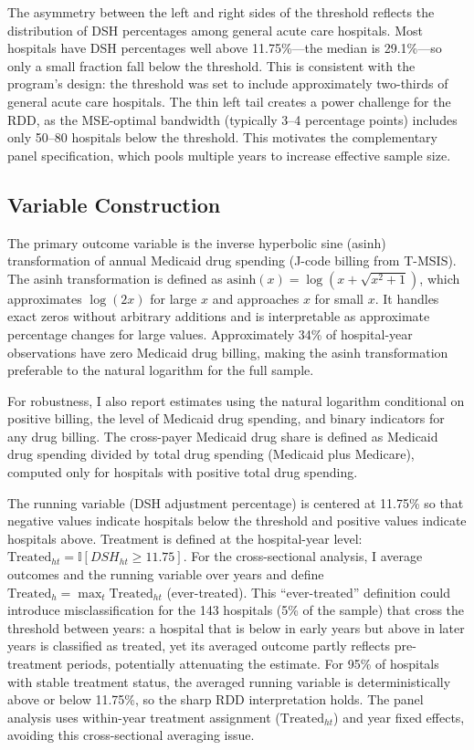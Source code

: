 \documentclass[12pt]{article}
\begin{document}
The asymmetry between the left and right sides of the threshold reflects the distribution of DSH percentages among general acute care hospitals. Most hospitals have DSH percentages well above 11.75\%---the median is 29.1\%---so only a small fraction fall below the threshold. This is consistent with the program's design: the threshold was set to include approximately two-thirds of general acute care hospitals. The thin left tail creates a power challenge for the RDD, as the MSE-optimal bandwidth (typically 3--4 percentage points) includes only 50--80 hospitals below the threshold. This motivates the complementary panel specification, which pools multiple years to increase effective sample size.

\subsection{Variable Construction}

The primary outcome variable is the inverse hyperbolic sine (asinh) transformation of annual Medicaid drug spending (J-code billing from T-MSIS). The asinh transformation is defined as $\text{asinh}(x) = \log(x + \sqrt{x^2 + 1})$, which approximates $\log(2x)$ for large $x$ and approaches $x$ for small $x$. It handles exact zeros without arbitrary additions and is interpretable as approximate percentage changes for large values. Approximately 34\% of hospital-year observations have zero Medicaid drug billing, making the asinh transformation preferable to the natural logarithm for the full sample.

For robustness, I also report estimates using the natural logarithm conditional on positive billing, the level of Medicaid drug spending, and binary indicators for any drug billing. The cross-payer Medicaid drug share is defined as Medicaid drug spending divided by total drug spending (Medicaid plus Medicare), computed only for hospitals with positive total drug spending.

The running variable (DSH adjustment percentage) is centered at 11.75\% so that negative values indicate hospitals below the threshold and positive values indicate hospitals above. Treatment is defined at the hospital-year level: $\text{Treated}_{ht} = \mathbb{I}[DSH_{ht} \geq 11.75]$. For the cross-sectional analysis, I average outcomes and the running variable over years and define $\text{Treated}_h = \max_t \text{Treated}_{ht}$ (ever-treated). This ``ever-treated'' definition could introduce misclassification for the 143 hospitals (5\% of the sample) that cross the threshold between years: a hospital that is below in early years but above in later years is classified as treated, yet its averaged outcome partly reflects pre-treatment periods, potentially attenuating the estimate. For 95\% of hospitals with stable treatment status, the averaged running variable is deterministically above or below 11.75\%, so the sharp RDD interpretation holds. The panel analysis uses within-year treatment assignment ($\text{Treated}_{ht}$) and year fixed effects, avoiding this cross-sectional averaging issue.
\end{document}
